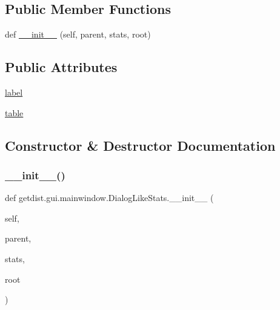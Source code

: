 \subsection*{Public Member Functions}
\begin{DoxyCompactItemize}
\item 
def \mbox{\hyperlink{classgetdist_1_1gui_1_1mainwindow_1_1DialogLikeStats_ae09609123684ca9cd1610cedd7d9f338}{\+\_\+\+\_\+init\+\_\+\+\_\+}} (self, parent, stats, root)
\end{DoxyCompactItemize}
\subsection*{Public Attributes}
\begin{DoxyCompactItemize}
\item 
\mbox{\hyperlink{classgetdist_1_1gui_1_1mainwindow_1_1DialogLikeStats_add2855829c270e57adf15d396a8d3e5c}{label}}
\item 
\mbox{\hyperlink{classgetdist_1_1gui_1_1mainwindow_1_1DialogLikeStats_a664e82d4fcc5db061997eb791f40b605}{table}}
\end{DoxyCompactItemize}


\subsection{Constructor \& Destructor Documentation}
\mbox{\label{classgetdist_1_1gui_1_1mainwindow_1_1DialogLikeStats_ae09609123684ca9cd1610cedd7d9f338}} 
\subsubsection{\texorpdfstring{\+\_\+\+\_\+init\+\_\+\+\_\+()}{\_\_init\_\_()}}
{\footnotesize\ttfamily def getdist.\+gui.\+mainwindow.\+Dialog\+Like\+Stats.\+\_\+\+\_\+init\+\_\+\+\_\+ (\begin{DoxyParamCaption}\item[{}]{self,  }\item[{}]{parent,  }\item[{}]{stats,  }\item[{}]{root }\end{DoxyParamCaption})}



